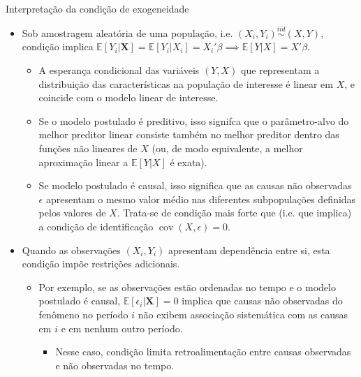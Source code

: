 \documentclass[11pt]{beamer}
\begin{document}
\begin{frame}{Interpretação da condição de exogeneidade}
\begin{itemize}


		\item Sob amostragem aleatória de uma população, i.e. $(X_i,Y_i)\overset{iid}{\sim}(X,Y)$, condição implica $\mathbb{E}[Y_i|\boldsymbol{X}] = \mathbb{E}[Y_i|X_i] = X_i'\beta \implies \mathbb{E}[Y|X]=X'\beta$.
		\begin{itemize}
			\item A esperança condicional das variáveis $(Y,X)$ que representam a distribuição das características na população de interesse é linear em $X$, {\color{green}e coincide com o modelo linear de interesse}.
				\item Se o modelo postulado é {\color{blue}preditivo}, isso signifca que o parâmetro-alvo do melhor preditor linear consiste também no melhor preditor dentro das funções não lineares de $X$ (ou, de modo equivalente, a melhor aproximação linear a $\mathbb{E}[Y|X]$ é exata).
				\item Se modelo postulado é {\color{blue}causal}, isso significa que as causas não observadas $\epsilon$ apresentam o mesmo valor médio nas diferentes subpopulações definidas pelos valores de $X$. Trata-se de condição mais forte que (i.e. que implica) a condição de identificação $\operatorname{cov}(X,\epsilon) = 0$.
		\end{itemize}
					\item Quando as observações $(X_i,Y_i)$  apresentam dependência entre si, esta condição impõe restrições adicionais.
					\begin{itemize}
						\item Por exemplo, se as observações estão ordenadas no tempo e o modelo postulado é causal, $\mathbb{E}[\epsilon_i|\boldsymbol{X}]=0$ implica que causas não observadas  do fenômeno no período $i$ não exibem associação sistemática com as causas em $i$ {\color{red}e em nenhum outro período}.
						\begin{itemize}
							\item Nesse caso, condição limita retroalimentação entre causas observadas e não observadas no tempo.
						\end{itemize}
					\end{itemize} 
	\end{itemize}

\end{frame}
\end{document}
